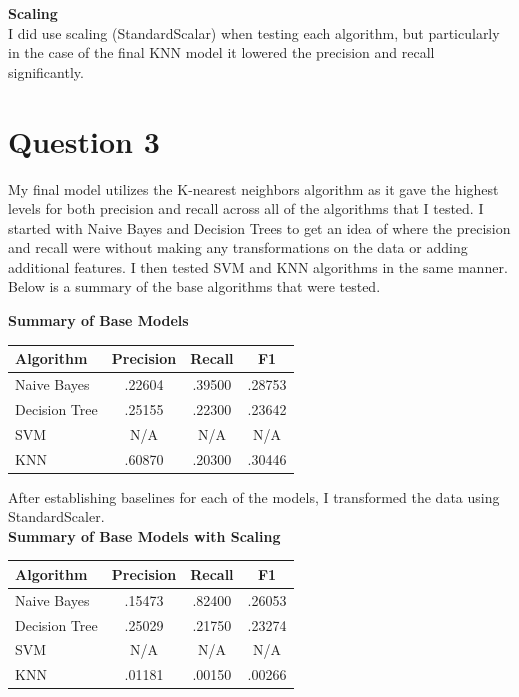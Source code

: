 \documentclass[a4paper,11pt]{report}
\begin{document}
\textbf{Scaling} \\

I did use scaling (StandardScalar) when testing each algorithm, but particularly
in the case of the final KNN model it lowered the precision and recall
significantly.

\section{Question 3}
  
My final model utilizes the K-nearest neighbors algorithm as it gave the highest
levels for both precision and recall across all of the algorithms that I tested.
I started with Naive Bayes and Decision Trees to get an idea of where the
precision and recall were without making any transformations on the data or
adding additional features.  I then tested SVM and KNN algorithms in the same
manner.  Below is a summary of the base algorithms that were tested.

\textbf{Summary of Base Models} \\
\begin{center}
    \begin{tabular}{|| l c c c||}
        \hline Algorithm & Precision & Recall & F1 \\
        \hline\hline
        Naive Bayes & .22604 & .39500 & .28753 \\
        \hline
        Decision Tree & .25155 & .22300 & .23642 \\
        \hline
        SVM & N/A & N/A & N/A \\
        \hline
        KNN & .60870 & .20300 & .30446  \\
        \hline
    \end{tabular}
\end{center}

After establishing baselines for each of the models, I transformed the data
using StandardScaler. \\

\textbf{Summary of Base Models with Scaling} \\
\begin{center}
    \begin{tabular}{|| l c c c ||}
        \hline Algorithm & Precision & Recall & F1 \\
        \hline\hline
        Naive Bayes & .15473 & .82400 & .26053 \\
        \hline
        Decision Tree & .25029 & .21750 & .23274 \\
        \hline
        SVM & N/A & N/A & N/A \\
        \hline
        KNN & .01181 & .00150 & .00266  \\
        \hline
    \end{tabular}
\end{center}
\end{document}
